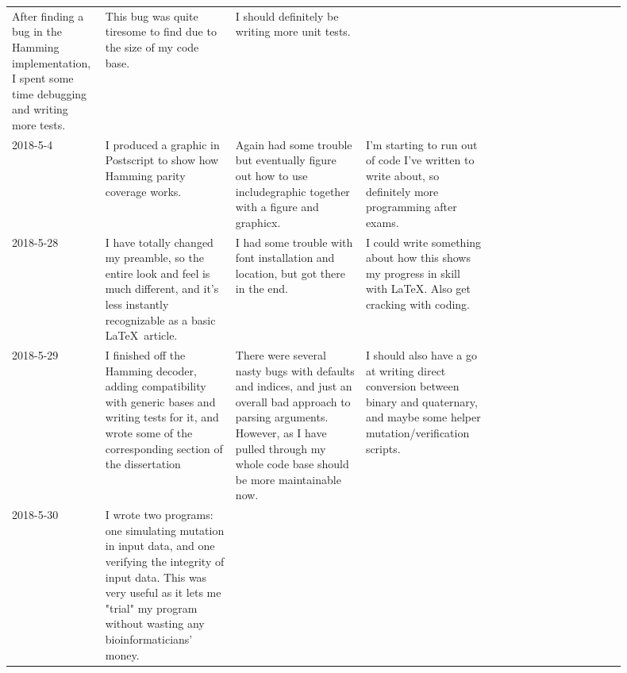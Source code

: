 \documentclass{article}
\begin{document}
\begin{center}
{\begin{longtable}{p{0.1\linewidth} p{0.2\linewidth} p{0.2\linewidth} p{0.2\linewidth} p{0.2\linewidth}}
    After finding a bug in the Hamming implementation, I spent some time
    debugging and writing more tests. &

    This bug was quite tiresome to find due to the size of my code base. &

    I should definitely be writing more unit tests.

    \\ 2018-5-4 &

    I produced a graphic in Postscript to show how Hamming parity coverage
    works. &

    Again had some trouble but eventually figure out how to use includegraphic
    together with a figure and graphicx. &

    I'm starting to run out of code I've written to write about, so definitely
    more programming after exams.

    \\ 2018-5-28 &

    I have totally changed my preamble, so the entire look and feel is much
    different, and it's less instantly recognizable as a basic \LaTeX\ article. &

    I had some trouble with font installation and location, but got there in the
    end. &

    I could write something about how this shows my progress in skill with
    \LaTeX. Also get cracking with coding.

    \\ 2018-5-29 &

    I finished off the Hamming decoder, adding compatibility with generic bases
    and writing tests for it, and wrote some of the corresponding section of the
    dissertation &

    There were several nasty bugs with defaults and indices, and just an overall
    bad approach to parsing arguments. However, as I have pulled through my
    whole code base should be more maintainable now. &

    I should also have a go at writing direct conversion between binary and
    quaternary, and maybe some helper mutation/verification scripts.

    \\ 2018-5-30 &

    I wrote two programs: one simulating mutation in input data, and one
    verifying the integrity of input data. This was very useful as it lets me
    "trial" my program without wasting any bioinformaticians' money. &


\end{longtable}}
\end{center}
\end{document}
